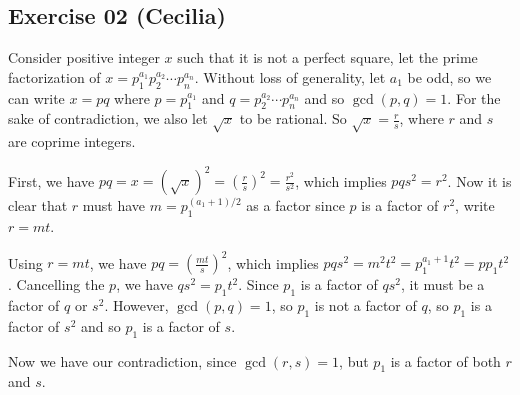 \subsection*{Exercise 02 (Cecilia)}

Consider positive integer $x$ such that it is not a perfect square, let the prime factorization of $x = p_1^{a_1}p_2^{a_2} \cdots p_n^{a_n}$. Without loss of generality, let $a_1$ be odd, so we can write $x = p q$ where $p = p_1^{a_1}$ and $q = p_2^{a_2} \cdots p_n^{a_n}$ and so $\gcd(p, q) = 1$. For the sake of contradiction, we also let $\sqrt{x}$ to be rational. So $\sqrt{x} = \frac{r}{s}$, where $r$ and $s$ are coprime integers.

First, we have $pq = x = (\sqrt{x})^2 = \left(\frac{r}{s}\right)^2 = \frac{r^2}{s^2}$, which implies $pqs^2 = r^2$. Now it is clear that $r$ must have $m = p_1^{(a_1 + 1)/2}$ as a factor since $p$ is a factor of $r^2$, write $r = m t$.

Using $r = mt$, we have $ pq = \left(\frac{mt}{s}\right)^2$, which implies $pqs^2 = m^2 t^2 = p_1^{a_1 + 1}t^2 = p p_1 t^2$. Cancelling the $p$, we have $qs^2 = p_1 t^2$. Since $p_1$ is a factor of $qs^2$, it must be a factor of $q$ or $s^2$. However, $\gcd(p, q) = 1$, so $p_1$ is not a factor of $q$, so $p_1$ is a factor of $s^2$ and so $p_1$ is a factor of $s$.

Now we have our contradiction, since $\gcd(r, s) = 1$, but $p_1$ is a factor of both $r$ and $s$.

